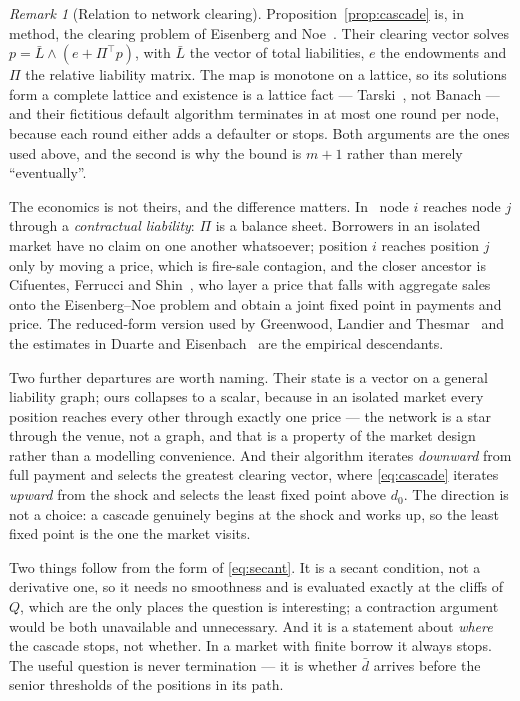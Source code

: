 \documentclass[11pt,a4paper]{article}
\theoremstyle{plain}
\theoremstyle{definition}
\theoremstyle{remark}
\newtheorem{remark}[proposition]{Remark}
\begin{document}
\begin{remark}[Relation to network clearing]\label{rem:en}
Proposition~\ref{prop:cascade} is, in method, the clearing problem of Eisenberg and
Noe~\cite{eisenberg2001}. Their clearing vector solves $p=\bar L \wedge (e+\Pi^{\!\top}p)$, with
$\bar L$ the vector of total liabilities, $e$ the endowments and $\Pi$ the relative liability
matrix. The map is monotone on a lattice, so its solutions form a complete lattice and existence
is a lattice fact --- Tarski~\cite{tarski1955}, not Banach --- and their fictitious default
algorithm terminates in at most one round per node, because each round either adds a defaulter or
stops. Both arguments are the ones used above, and the second is why
the bound is $m+1$ rather than merely ``eventually''.

The economics is not theirs, and the difference matters. In~\cite{eisenberg2001} node $i$ reaches
node $j$ through a \emph{contractual liability}: $\Pi$ is a balance sheet. Borrowers in an isolated
market have no claim on one another whatsoever; position $i$ reaches position $j$ only by moving a
price, which is fire-sale contagion, and the closer ancestor is Cifuentes, Ferrucci and
Shin~\cite{cifuentes2005}, who layer a price that falls with aggregate sales onto the Eisenberg--Noe
problem and obtain a joint fixed point in payments and price. The reduced-form version used by
Greenwood, Landier and Thesmar~\cite{greenwood2015} and the estimates in Duarte and
Eisenbach~\cite{duarte2021} are the empirical descendants.

Two further departures are worth naming. Their state is a vector on a general liability graph;
ours collapses to a scalar, because in an isolated market every position reaches every other
through exactly one price --- the network is a star through the venue, not a graph, and that is a
property of the market design rather than a modelling convenience. And their algorithm iterates
\emph{downward} from full payment and selects the greatest clearing vector, where
\eqref{eq:cascade} iterates \emph{upward} from the shock and selects the least fixed point above
$d_0$. The direction is not a choice: a cascade genuinely begins at the shock and works up, so the
least fixed point is the one the market visits.
\end{remark}

Two things follow from the form of \eqref{eq:secant}. It is a secant condition, not a derivative
one, so it needs no smoothness and is evaluated exactly at the cliffs of $Q$, which are the only
places the question is interesting; a contraction argument would be both unavailable and
unnecessary. And it is a statement about \emph{where} the cascade stops, not whether. In a market
with finite borrow it always stops. The useful question is never termination --- it is whether
$\bar d$ arrives before the senior thresholds of the positions in its path.
\end{document}
